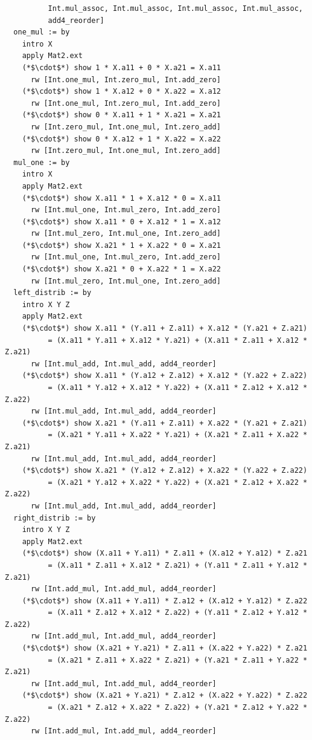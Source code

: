 \begin{lstlisting}
          Int.mul_assoc, Int.mul_assoc, Int.mul_assoc, Int.mul_assoc,
          add4_reorder]
  one_mul := by
    intro X
    apply Mat2.ext
    (*$\cdot$*) show 1 * X.a11 + 0 * X.a21 = X.a11
      rw [Int.one_mul, Int.zero_mul, Int.add_zero]
    (*$\cdot$*) show 1 * X.a12 + 0 * X.a22 = X.a12
      rw [Int.one_mul, Int.zero_mul, Int.add_zero]
    (*$\cdot$*) show 0 * X.a11 + 1 * X.a21 = X.a21
      rw [Int.zero_mul, Int.one_mul, Int.zero_add]
    (*$\cdot$*) show 0 * X.a12 + 1 * X.a22 = X.a22
      rw [Int.zero_mul, Int.one_mul, Int.zero_add]
  mul_one := by
    intro X
    apply Mat2.ext
    (*$\cdot$*) show X.a11 * 1 + X.a12 * 0 = X.a11
      rw [Int.mul_one, Int.mul_zero, Int.add_zero]
    (*$\cdot$*) show X.a11 * 0 + X.a12 * 1 = X.a12
      rw [Int.mul_zero, Int.mul_one, Int.zero_add]
    (*$\cdot$*) show X.a21 * 1 + X.a22 * 0 = X.a21
      rw [Int.mul_one, Int.mul_zero, Int.add_zero]
    (*$\cdot$*) show X.a21 * 0 + X.a22 * 1 = X.a22
      rw [Int.mul_zero, Int.mul_one, Int.zero_add]
  left_distrib := by
    intro X Y Z
    apply Mat2.ext
    (*$\cdot$*) show X.a11 * (Y.a11 + Z.a11) + X.a12 * (Y.a21 + Z.a21)
          = (X.a11 * Y.a11 + X.a12 * Y.a21) + (X.a11 * Z.a11 + X.a12 * Z.a21)
      rw [Int.mul_add, Int.mul_add, add4_reorder]
    (*$\cdot$*) show X.a11 * (Y.a12 + Z.a12) + X.a12 * (Y.a22 + Z.a22)
          = (X.a11 * Y.a12 + X.a12 * Y.a22) + (X.a11 * Z.a12 + X.a12 * Z.a22)
      rw [Int.mul_add, Int.mul_add, add4_reorder]
    (*$\cdot$*) show X.a21 * (Y.a11 + Z.a11) + X.a22 * (Y.a21 + Z.a21)
          = (X.a21 * Y.a11 + X.a22 * Y.a21) + (X.a21 * Z.a11 + X.a22 * Z.a21)
      rw [Int.mul_add, Int.mul_add, add4_reorder]
    (*$\cdot$*) show X.a21 * (Y.a12 + Z.a12) + X.a22 * (Y.a22 + Z.a22)
          = (X.a21 * Y.a12 + X.a22 * Y.a22) + (X.a21 * Z.a12 + X.a22 * Z.a22)
      rw [Int.mul_add, Int.mul_add, add4_reorder]
  right_distrib := by
    intro X Y Z
    apply Mat2.ext
    (*$\cdot$*) show (X.a11 + Y.a11) * Z.a11 + (X.a12 + Y.a12) * Z.a21
          = (X.a11 * Z.a11 + X.a12 * Z.a21) + (Y.a11 * Z.a11 + Y.a12 * Z.a21)
      rw [Int.add_mul, Int.add_mul, add4_reorder]
    (*$\cdot$*) show (X.a11 + Y.a11) * Z.a12 + (X.a12 + Y.a12) * Z.a22
          = (X.a11 * Z.a12 + X.a12 * Z.a22) + (Y.a11 * Z.a12 + Y.a12 * Z.a22)
      rw [Int.add_mul, Int.add_mul, add4_reorder]
    (*$\cdot$*) show (X.a21 + Y.a21) * Z.a11 + (X.a22 + Y.a22) * Z.a21
          = (X.a21 * Z.a11 + X.a22 * Z.a21) + (Y.a21 * Z.a11 + Y.a22 * Z.a21)
      rw [Int.add_mul, Int.add_mul, add4_reorder]
    (*$\cdot$*) show (X.a21 + Y.a21) * Z.a12 + (X.a22 + Y.a22) * Z.a22
          = (X.a21 * Z.a12 + X.a22 * Z.a22) + (Y.a21 * Z.a12 + Y.a22 * Z.a22)
      rw [Int.add_mul, Int.add_mul, add4_reorder]
\end{lstlisting}

